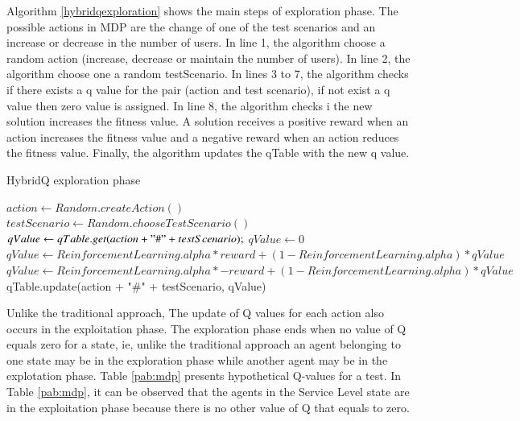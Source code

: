 \documentclass[espaco=umemeio,chapter=TITLE,twoside,openright]{abnt}
\begin{document}
Algorithm \ref{hybridqexploration} shows the main steps of exploration phase. The possible actions in MDP are the change of one of the test scenarios and an increase or decrease in the number of users. In line 1, the algorithm choose a random action (increase, decrease or maintain the number of users). In line 2, the algorithm choose one a random testScenario. In lines 3 to 7, the algorithm checks if there exists a q value  for the pair (action and test scenario), if not exist a q value then zero value is assigned. In line 8, the algorithm checks i the new solution increases the fitness value. A solution receives a positive reward when an action increases the fitness value and a negative reward when an action reduces the fitness value.  Finally, the algorithm updates the qTable with the new q value.


\begin{algorithm}[h]
  \caption{HybridQ exploration phase }\label{hybridqexploration}
  \begin{algorithmic}[1]    
    \State $action \gets Random.createAction()$
    \State $testScenario \gets Random.chooseTestScenario()$
    \State $ qValue \gets qTable.get(action + "\#" + testScenario);$
    \Else
        \State $ qValue \gets 0$
    \EndIf
     \State $qValue \gets ReinforcementLearning.alpha * reward + (1 - ReinforcementLearning.alpha) * qValue$     
     \Else
          \State $qValue \gets ReinforcementLearning.alpha * -reward + (1 - ReinforcementLearning.alpha) * qValue$     
    \EndIf     
    \State qTable.update(action + "\#" + testScenario, qValue)    
  \end{algorithmic}
\end{algorithm}

 

Unlike the traditional approach, The update of Q values for each action also occurs in the exploitation phase. The exploration phase ends when no value of Q equals zero for a state, ie, unlike the traditional approach an agent belonging to one state may be in the exploration phase while another agent may be in the explotation phase. Table \ref{pab:mdp} presents hypothetical Q-values for a test. In Table \ref{pab:mdp}, it can be observed that the agents in the Service Level state are in the exploitation phase because there is no other value of Q that equals to zero.
\end{document}
